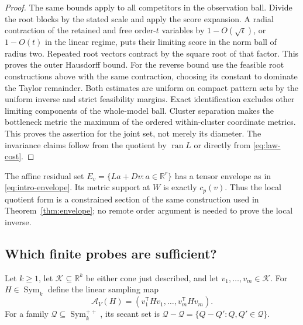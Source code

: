 \documentclass[11pt,reqno]{amsart}
\numberwithin{equation}{section}
\theoremstyle{definition}
\theoremstyle{remark}
\newcommand{\R}{\mathbb R}
\newcommand{\Sym}{\operatorname{Sym}}
\newcommand{\cK}{\mathcal K}
\newcommand{\cQ}{\mathscr Q}
\begin{document}
\begin{proof}
The same bounds apply to all competitors in the observation ball. Divide the root blocks by the stated scale and apply the score expansion. A radial contraction of the retained and free order-$t$ variables by $1-O(\sqrt t)$, or $1-O(t)$ in the linear regime, puts their limiting score in the norm ball of radius two. Repeated root vectors contract by the square root of that factor. This proves the outer Hausdorff bound. For the reverse bound use the feasible root constructions above with the same contraction, choosing its constant to dominate the Taylor remainder. Both estimates are uniform on compact pattern sets by the uniform inverse and strict feasibility margins. Exact identification excludes other limiting components of the whole-model ball. Cluster separation makes the bottleneck metric the maximum of the ordered within-cluster coordinate metrics. This proves the assertion for the joint set, not merely its diameter. The invariance claims follow from the quotient by $\operatorname{ran}L$ or directly from \eqref{eq:law-cost}.
\end{proof}

The affine residual set $E_v=\{La+Dv:a\in\R^r\}$ has a tensor envelope as in \eqref{eq:intro-envelope}. Its metric support at $W$ is exactly $c_p(v)$. Thus the local quotient form is a constrained section of the same construction used in Theorem~\ref{thm:envelope}; no remote order argument is needed to prove the local inverse.

\subsection{Which finite probes are sufficient?}
Let $k\ge1$, let $\cK\subseteq\R^k$ be either cone just described, and let $v_1,\ldots,v_m\in\cK$. For $H\in\Sym_k$ define the linear sampling map
\[
 \mathcal A_V(H)=(v_1^{\mathsf T}Hv_1,\ldots,v_m^{\mathsf T}Hv_m).
\]
For a family $\cQ\subseteq\Sym_k^{++}$, its secant set is $\cQ-\cQ=\{Q-Q':Q,Q'\in\cQ\}$.
\end{document}
